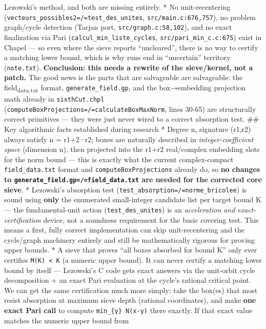 \documentclass[11pt]{article}
\begin{document}
Lezowski's method, and both are missing entirely. * No unit-recentering
(\texttt{vecteurs\_possibles2=/=test\_des\_unites}, \texttt{src/main.c:676,757}), no
problem graph/cycle detection (Tarjan port, \texttt{src/graph.c:58,102}), and
no exact finalization via Pari (\texttt{calcul\_min\_liste\_cycles},
\texttt{src/pari\_min\_c.c:675}) exist in Chapel --- so even where the sieve
reports “uncleared”, there is no way to certify a matching lower bound,
which is why runs end in “uncertain” territory (\texttt{note.txt}).
\textbf{Conclusion: this needs a rewrite of the sieve/kernel, not a patch.} The
good news is the parts that are salvageable are salvageable: the
field\textsubscript{data.txt} format, \texttt{generate\_field.gp}, and the box→embedding
projection math already in \texttt{sixthCut.chpl}
(\texttt{computeBoxProjections=/=calculateBoxMaxNorm}, lines 30-65) are
structurally correct primitives --- they were just never wired to a
correct absorption test. \#\# Key algorithmic facts established during
research * Degree n, signature (r1,r2) always satisfy n = r1+2·r2; boxes
are naturally described in \emph{integer-coefficient space} (dimension n),
then projected into the r1+r2 real/complex embedding slots for the norm
bound --- this is exactly what the current complex-compact
\texttt{field\_data.txt} format and \texttt{computeBoxProjections} already do, so \textbf{no
changes to \texttt{generate\_field.gp=/=field\_data.txt} are needed for the
corrected core sieve}. * Lezowski's absorption test
(\texttt{test\_absorption=/=norme\_bricolee}) is sound using \textbf{only} the
enumerated small-integer candidate list per target bound K --- the
fundamental-unit action (\texttt{test\_des\_unites}) is an \emph{acceleration and
exact-certification} device, not a soundness requirement for the basic
covering test. This means a first, fully correct implementation can skip
unit-recentering and the cycle/graph machinery entirely and still be
mathematically rigorous for proving upper bounds. * A sieve that proves
“all boxes absorbed for bound K” only ever certifies \texttt{M(K) < K} (a
numeric upper bound). It can never certify a matching lower bound by
itself --- Lezowski's C code gets exact answers via the unit-orbit cycle
decomposition + an exact Pari evaluation at the cycle's rational
critical point. We can get the same certification much more simply: take
the box(es) that most resist absorption at maximum sieve depth (rational
coordinates), and make \textbf{one exact Pari call} to compute \texttt{min\_\{γ\} N(x-γ)}
there exactly. If that exact value matches the numeric upper bound from
\end{document}
